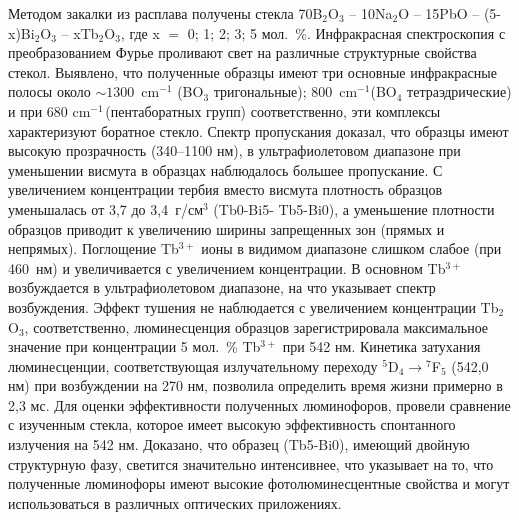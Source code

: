 \documentclass[press]{vestnik}
\begin{document}
Методом закалки из расплава получены стекла 70B$_{2}$O$_{3}$ -- 10Na$_{2}$O 
-- 15PbO -- (5-x)Bi$_{2}$O$_{3}$ -- xTb$_{2}$O$_{3}$, где x $=$ 0; 1; 2; 3; 
5 мол.~{\%}. Инфракрасная спектроскопия с преобразованием Фурье проливают 
свет на различные структурные свойства стекол. Выявлено, что полученные 
образцы имеют три основные инфракрасные полосы около $\sim 1300$~cm$^{-1}$ (BO$_{3}$ тригональные); 800~cm$^{-1}$(BO$_{4}$ 
тетраэдрические) и при 680 cm$^{-1\, }$(пентаборатных групп) соответственно, 
эти комплексы характеризуют боратное стекло. Спектр пропускания доказал, что 
образцы имеют высокую прозрачность (340--1100 нм), в ультрафиолетовом 
диапазоне при уменьшении висмута в образцах наблюдалось большее пропускание. 
С увеличением концентрации тербия вместо висмута плотность образцов 
уменьшалась от 3,7 до 3,4~г/см$^{3}$ (Tb0-Bi5- Tb5-Bi0), а уменьшение 
плотности образцов приводит к увеличению ширины запрещенных зон (прямых и 
непрямых). Поглощение Tb$^{3+}$ ионы в видимом диапазоне слишком слабое (при 
460~нм) и увеличивается с увеличением концентрации. В основном Tb$^{3+}$ 
возбуждается в ультрафиолетовом диапазоне, на что указывает спектр 
возбуждения. Эффект тушения не наблюдается с увеличением концентрации 
Tb$_{2}$O$_{3}$, соответственно, люминесценция образцов зарегистрировала 
максимальное значение при концентрации 5 мол.~{\%} Tb$^{3+}$ при 542 нм. 
Кинетика затухания люминесценции, соответствующая излучательному переходу 
$^{5}$D$_{4} \to {}^{7}$F$_{5}$ (542,0 нм) при возбуждении на 270 нм, 
позволила определить время жизни примерно в 2,3 мс. Для оценки эффективности 
полученных люминофоров, провели сравнение с изученным стекла, которое имеет 
высокую эффективность спонтанного излучения на 542 нм. Доказано, что образец 
(Tb5-Bi0), имеющий двойную структурную фазу, светится значительно 
интенсивнее, что указывает на то, что полученные люминофоры имеют высокие 
фотолюминесцентные свойства и могут использоваться в различных оптических 
приложениях.
\end{document}
